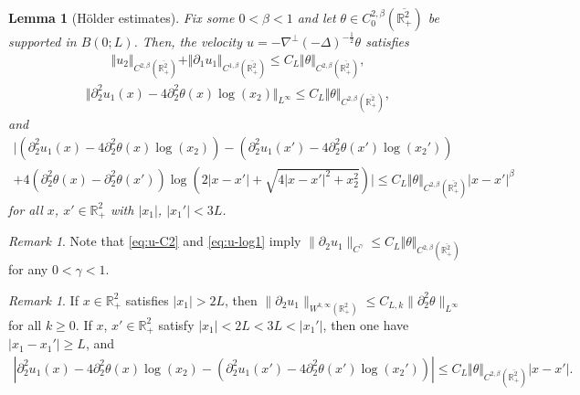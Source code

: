 \documentclass[10pt]{amsart}
\newtheorem{lemma}[theorem]{Lemma}
\theoremstyle{definition}
\theoremstyle{remark}
\newtheorem{remark}[theorem]{Remark}
\numberwithin{equation}{section}
\newcommand{\nrm}[1]{\Vert#1\Vert}
\newcommand{\lap}{\Delta}
\newcommand{\rd}{\partial}
\newcommand{\nb}{\nabla}
\newcommand{\0}{\emptyset}
\newcommand{\ohp}{\overline{\bbR^2_+}}
\newcommand{\alp}{\alpha}
\newcommand{\bt}{\beta}
\newcommand{\gmm}{\gamma}
\newcommand{\tht}{\theta}
\newcommand{\bbR}{\mathbb R}
\begin{document}
	
	
	
	\begin{lemma}[H\"older estimates]\label{lem:vel}
		Fix some $0<\bt<1$ and let $\tht \in C^{2,\bt}_{0}(\ohp)$ be supported in $B(0;L)$. Then, the velocity $u =- \nb^\perp (-\lap)^{-\frac12}\tht$ satisfies \begin{equation}\label{eq:u-C2}
			\begin{split}
				\nrm{u_2}_{C^{2,\bt}(\ohp)} + \nrm{\rd_1 u_1}_{C^{1,\bt}(\ohp)} \le  C_{L}\nrm{\tht}_{C^{2,\bt}(\ohp)},
			\end{split}
		\end{equation}  \begin{equation}\label{eq:u-log1}
			\begin{split}
				\nrm{\rd_2^2 u_1(x) - 4\rd_2^2 \tht(x) \log (x_2) }_{L^{\infty}} \le  C_{L}\nrm{\tht}_{C^{2,\bt}(\ohp)},
			\end{split}
		\end{equation}  and \begin{multline}\label{eq:u-log}
			\bigg|(\rd_{2}^2u_{1} (x) - 4\rd_{2}^2 \tht(x) \log (x_2)) - (\rd_{2}^2u_1(x') - 4 \rd_{2}^2\tht(x') \log (x_2')) \\
			+ 4(\rd_{2}^2 \tht(x) - \rd_{2}^2 \tht(x')) \log (2|x-x'| + \sqrt{4|x-x'|^2 + x_2^2}) \bigg| \le C_{L}\nrm{\tht}_{C^{2,\bt}(\ohp)} |x-x'|^{\beta}
		\end{multline} for all $x$, $x' \in \bbR^2_{+}$ with $|x_1|$, $|x_1'| < 3L$. 
	\end{lemma}
	\begin{remark}\label{rmk:gm}
		Note that \eqref{eq:u-C2} and \eqref{eq:u-log1} imply $\| \partial_2 u_1 \|_{C^{\gamma}} \leq C_{L}\nrm{\tht}_{C^{2,\bt}(\ohp)}$ for any $0 < \gamma < 1$.
	\end{remark}
	\begin{remark}
		If $x \in \bbR^2_{+}$ satisfies $|x_1|> 2L$, then $\| \partial_2 u_1 \|_{W^{k,\infty}(\bbR^2_{+})} \leq C_{L,k} \| \rd_{2}^2 \tht \|_{L^{\infty}}$ for all $k \geq 0$. If $x$, $x' \in \bbR^2_{+}$ satisfy $|x_1| < 2L < 3L < |x_1'|$, then one have $|x_1 - x_1'| \geq L$, and  \begin{equation*}
			\begin{split}
				|\rd_{2}^2u_{1} (x) - 4\rd_{2}^2 \tht(x) \log (x_2) - (\rd_{2}^2u_1(x') - 4 \rd_{2}^2\tht(x') \log (x_2')) | \leq C_{L}\nrm{\tht}_{C^{2,\bt}(\ohp)} |x-x'|.
			\end{split}
		\end{equation*}
	\end{remark}
	
\end{document}
